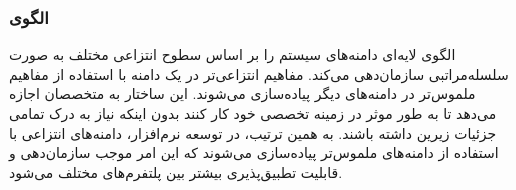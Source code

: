 \subsubsection{الگوی }
\label{archLayerSec}
\begin{RTL}
الگوی لایه‌ای \cite{ref4} دامنه‌های سیستم را بر اساس سطوح انتزاعی
مختلف به صورت سلسله‌مراتبی
سازمان‌دهی می‌کند. مفاهیم انتزاعی‌تر در یک دامنه با استفاده
از مفاهیم ملموس‌تر در دامنه‌های دیگر پیاده‌سازی می‌شوند.
این ساختار به متخصصان اجازه می‌دهد تا به طور موثر در زمینه تخصصی
خود کار کنند بدون اینکه نیاز به درک تمامی جزئیات زیرین
داشته باشند. به همین ترتیب، در توسعه نرم‌افزار،
دامنه‌های انتزاعی با استفاده از دامنه‌های ملموس‌تر پیاده‌سازی
می‌شوند که این امر موجب سازمان‌دهی و قابلیت تطبیق‌پذیری بیشتر بین
پلتفرم‌های مختلف می‌شود.
\end{RTL}